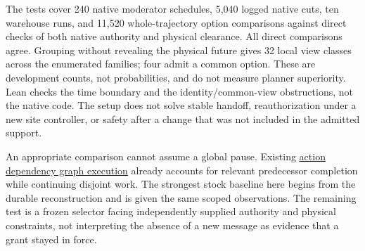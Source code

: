 \documentclass[11pt]{article}
\begin{document}
The tests cover 240 native moderator schedules, 5,040 logged
native cuts, ten warehouse runs, and 11,520 whole-trajectory
option comparisons against direct checks of both native authority
and physical clearance. All direct comparisons agree. Grouping
without revealing the physical future gives 32 local view classes
across the enumerated families; four admit a common option. These
are development counts, not probabilities, and do not measure
planner superiority. Lean checks the time boundary and the
identity/common-view obstructions, not the native code. The setup
does not solve stable handoff, reauthorization under a new site
controller, or safety after a change that was not included in the
admitted support.

An appropriate comparison cannot assume a global pause. Existing
\href{https://whoenig.github.io/publications/2019_RA-L_Hoenig.pdf}{action
dependency graph execution} already accounts for relevant predecessor
completion while continuing disjoint work. The strongest stock
baseline here begins from the durable reconstruction and is given
the same scoped observations. The remaining test is a frozen selector
facing independently supplied authority and physical constraints, not
interpreting the absence of a new message as evidence that a grant
stayed in force.
\end{document}
